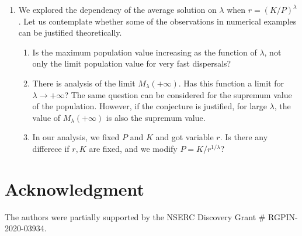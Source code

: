 \documentclass[11pt]{article}
\newcommand{\parentheses}[1]{\left(#1\right)}
\theoremstyle{definition}
\theoremstyle{remark}
\begin{document}
\begin{enumerate}
\begin{equation}
\label{harvesting}
    \begin{cases}
        d\Delta\parentheses{\frac{u}{P}}+ru\parentheses{1-\frac{u}{K}} - Eu=0, & x \in \Omega,  \\
        \frac{\partial}{\partial n}\parentheses{\frac{u}{P}}=0,  & x \in \partial\Omega
    \end{cases} 
\end{equation} 
the problem of maximizing the Maximum Sustainable Yield (MSY)  $\displaystyle   \int_{\Omega} E(x)u(x)~dx$. 
In \cite{Brav} for $P \equiv K$, it was noticed that $E=r/2$ leads to MSY. With some non-constant $P \not\equiv K$,
for which $r$ is MSY achieved? If, in addition to $E$, we can control the diffusion coefficient $d$, how is MSY 
$d$-dependent? 

\item
We explored the dependency of the average solution on $\lambda$ when
$r=(K/P)^{\lambda}$. Let us contemplate whether some of the observations in numerical examples can be justified theoretically.
\begin{enumerate}
\item
Is the maximum population value increasing as the function of $\lambda$, not only the limit population value for very fast dispersals?
\item
There is analysis of the limit $M_{\lambda}(+\infty)$. Has this function a limit for $\lambda \to +\infty$?
The same question can be considered for the supremum value of the population. 
However, if the conjecture is justified, for large $\lambda$, the value of $M_{\lambda}(+\infty)$ is also the supremum value.
\item
 In our analysis, we fixed $P$ and $K$ and got variable $r$. Is there any differece if $r,K$ are fixed, and we modify 
$\displaystyle  P=K/r^{1/\lambda}$?
\end{enumerate}
\end{enumerate}

\section*{Acknowledgment}

The authors  were  partially supported by the NSERC Discovery Grant \#  RGPIN-2020-03934.
\end{document}
